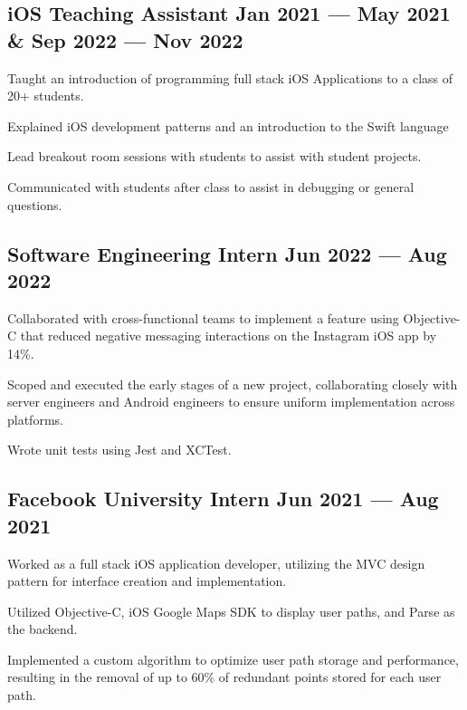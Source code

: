 
\subsection{{iOS Teaching Assistant \hfill Jan 2021 --- May 2021 \& Sep 2022 --- Nov 2022}}
\begin{zitemize}
\item Taught an introduction of programming full stack iOS Applications to a class of 20+ students.
\item Explained iOS development patterns and an introduction to the Swift language
\item Lead breakout room sessions with students to assist with student projects.
\item Communicated with students after class to assist in debugging or general questions.
\end{zitemize}


\subsection{{Software Engineering Intern \hfill Jun 2022 --- Aug 2022}}
\begin{zitemize}
\item Collaborated with cross-functional teams to implement a feature using Objective-C that reduced negative messaging interactions on the Instagram iOS app by 14\%.
\item Scoped and executed the early stages of a new project, collaborating closely with server engineers and Android engineers to ensure uniform implementation across platforms.
\item Wrote unit tests using Jest and XCTest.
\end{zitemize}

\subsection{{Facebook University Intern \hfill Jun 2021 --- Aug 2021}}
\begin{zitemize}
\item Worked as a full stack iOS application developer, utilizing the MVC design pattern for interface creation and implementation.
\item Utilized Objective-C, iOS Google Maps SDK to display user paths, and Parse as the backend.
\item Implemented a custom algorithm to optimize user path storage and performance, resulting in the removal of up to 60\% of redundant points stored for each user path.
\end{zitemize}

